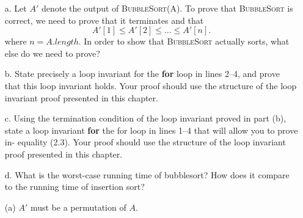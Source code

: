 \documentclass{report}
\makeatletter
\renewenvironment{framed}{%
 \def\FrameCommand##1{\hskip\@totalleftmargin
 \fboxsep=\FrameSep\fbox{##1}}%
 \MakeFramed {\advance\hsize-\width
   \@totalleftmargin\z@ \linewidth\hsize
   \@setminipage}}%
 {\par\unskip\endMakeFramed}
\makeatother
\begin{document}
\begin{enumerate}
{\begin{enumerate}
\item[a.] Let $A'$ denote the output of \textsc{BubbleSort(A)}. To prove that
\textsc{BubbleSort} is correct, we need to prove that it terminates and that
\begin{equation*}
  A'[1] \le A'[2] \le \dots \le A'[n].
\end{equation*}
where $n = A.length$. In order to show that \textsc{BubbleSort} actually sorts,
what else do we need to prove?

\item[b.] State precisely a loop invariant for the \textbf{for} loop in lines
2{--}4, and prove that this loop invariant holds. Your proof should use the
structure of the loop invariant proof presented in this chapter.

\item[c.] Using the termination condition of the loop invariant proved in part
(b), state a loop invariant \textbf{for} the for loop in lines 1{--}4 that will
allow you to prove in- equality (2.3). Your proof should use the structure of
the loop invariant proof presented in this chapter.

\item[d.] What is the worst-case running time of bubblesort? How does it compare
  to the running time of insertion sort?
\end{enumerate}
}

\newpage

\begin{framed}

\begin{enumerate}
\item[(a)] $A'$ must be a permutation of $A$.


\end{enumerate}
\end{framed}
\end{enumerate}
\end{document}

